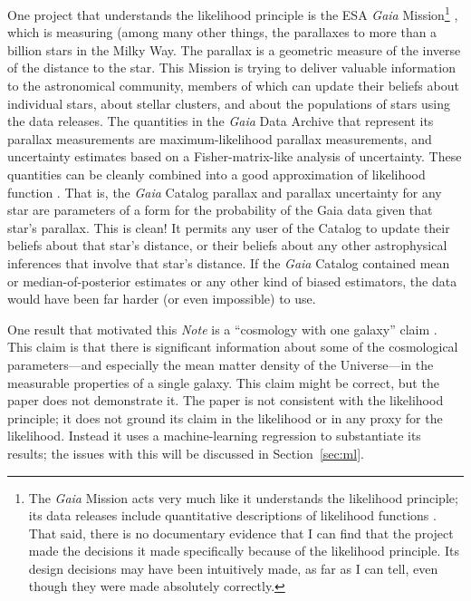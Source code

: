 \documentclass{article}
\newcommand{\documentname}{\textsl{Note}}
\newcommand{\sectionname}{Section}
\newcommand{\secref}[1]{\sectionname~\ref{#1}}
\begin{document}
One project that understands the likelihood principle is the ESA \textsl{Gaia} Mission\footnote{%
The \textsl{Gaia} Mission acts very much like it understands the likelihood principle; its data releases include quantitative descriptions of likelihood functions \cite{gaialf}.
That said, there is no documentary evidence that I can find that the project made the decisions it made specifically because of the likelihood principle.
Its design decisions may have been intuitively made, as far as I can tell, even though they were made absolutely correctly.}
\cite{gaia},
which is measuring (among many other things, the parallaxes to more than a billion stars in the Milky Way.
The parallax is a geometric measure of the inverse of the distance to the star.
This Mission is trying to deliver valuable information to the astronomical community, members of which can update their beliefs about individual stars, about stellar clusters, and about the populations of stars using the data releases.
The quantities in the \textsl{Gaia} Data Archive \cite{gaiadata} that represent its parallax measurements are maximum-likelihood parallax measurements, and uncertainty estimates based on a Fisher-matrix-like analysis of uncertainty.
These quantities can be cleanly combined into a good approximation of likelihood function \cite{gaialf}.
That is, the \textsl{Gaia} Catalog parallax and parallax uncertainty for any star are parameters of a form for the probability of the Gaia data given that star's parallax.
This is clean!
It permits any user of the Catalog to update their beliefs about that star's distance, or their beliefs about any other astrophysical inferences that involve that star's distance.
If the \textsl{Gaia} Catalog contained mean or median-of-posterior estimates or any other kind of biased estimators, the data would have been far harder (or even impossible) to use.

One result that motivated this \documentname{} is a ``cosmology with one galaxy'' claim \cite{onegalaxy}.
This claim is that there is significant information about some of the cosmological parameters---and especially the mean matter density of the Universe---in the measurable properties of a single galaxy.
This claim might be correct, but the paper does not demonstrate it.
The paper is not consistent with the likelihood principle; it does not ground its claim in the likelihood or in any proxy for the likelihood.
Instead it uses a machine-learning regression to substantiate its results; the issues with this will be discussed in \secref{sec:ml}.
\end{document}
